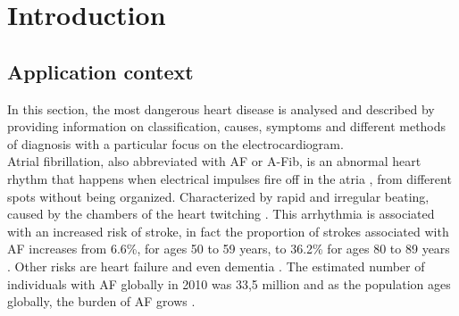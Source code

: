 \chapter{Introduction}
\label{sec:introduction}

\section{Application context}
In this section, the most dangerous heart disease is analysed and described by providing information on classification, causes, symptoms and different methods of diagnosis with a particular focus on the electrocardiogram.
\\
Atrial fibrillation, also abbreviated with AF or A-Fib, is an abnormal heart rhythm that happens when electrical impulses fire off in the atria , from different spots without being organized. Characterized by rapid and irregular beating, caused by the chambers of the heart twitching \cite{cdcgov17}. This arrhythmia is associated with an increased risk of stroke, in fact the proportion of strokes associated with AF increases from 6.6\%, for ages 50 to 59 years, to 36.2\% for ages 80 to 89 years \cite{10.1001/archinte.1987.00370090041008}. Other risks are heart failure and even dementia \cite{Munger2014}. The estimated number of individuals with AF globally in 2010 was 33,5 million and as the population ages globally, the burden of AF grows \cite{doi:10.1161/CIRCULATIONAHA.113.005119}.


